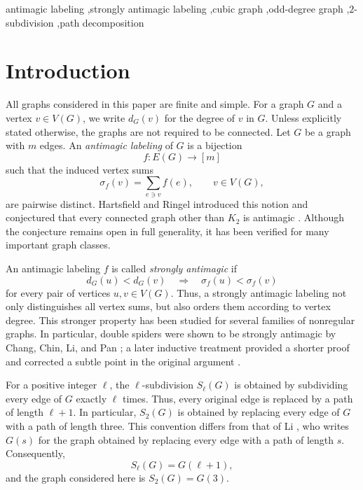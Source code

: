 \documentclass[preprint,12pt]{elsarticle}
\begin{document}
\begin{frontmatter}
\begin{keyword}
antimagic labeling \sep strongly antimagic labeling \sep cubic graph
\sep odd-degree graph \sep \(2\)-subdivision \sep path decomposition
\end{keyword}

\end{frontmatter}

\section{Introduction}
\label{sec:introduction}

All graphs considered in this paper are finite and simple. For a graph
\(G\) and a vertex \(v\in V(G)\), we write \(d_G(v)\) for the degree of
\(v\) in \(G\). Unless explicitly stated otherwise, the graphs are not
required to be connected. Let \(G\) be a graph with \(m\) edges. An
\emph{antimagic labeling} of \(G\) is a bijection
\[
f:E(G)\longrightarrow [m]
\]
such that the induced vertex sums
\[
\sigma_f(v)=\sum_{e\ni v}f(e),
\qquad v\in V(G),
\]
are pairwise distinct. Hartsfield and Ringel introduced this notion and
conjectured that every connected graph other than \(K_2\) is antimagic
\cite{hartsfield1989supermagic}. Although the conjecture remains open in
full generality, it has been verified for many important graph classes.

An antimagic labeling \(f\) is called \emph{strongly antimagic} if
\[
d_G(u)<d_G(v)
\quad\Longrightarrow\quad
\sigma_f(u)<\sigma_f(v)
\]
for every pair of vertices \(u,v\in V(G)\). Thus, a strongly antimagic
labeling not only distinguishes all vertex sums, but also orders them
according to vertex degree. This stronger property has been studied for
several families of nonregular graphs. In particular, double spiders were
shown to be strongly antimagic by Chang, Chin, Li, and Pan
\cite{chang2020double}; a later inductive treatment provided a shorter
proof and corrected a subtle point in the original argument
\cite{liu2022inductive}.

For a positive integer \(\ell\), the \(\ell\)-subdivision \(S_\ell(G)\)
is obtained by subdividing every edge of \(G\) exactly \(\ell\) times.
Thus, every original edge is replaced by a path of length \(\ell+1\). In
particular, \(S_2(G)\) is obtained by replacing every edge of \(G\) with
a path of length three. This convention differs from that of Li
\cite{li2025subdivisions}, who writes \(G(s)\) for the graph obtained by
replacing every edge with a path of length \(s\). Consequently,
\[
S_\ell(G)=G(\ell+1),
\]
and the graph considered here is \(S_2(G)=G(3)\).
\end{document}
